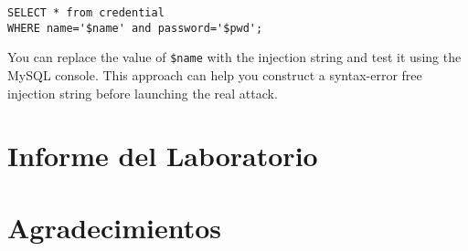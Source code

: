 \begin{lstlisting}
SELECT * from credential 
WHERE name='$name' and password='$pwd';
\end{lstlisting}

You can replace the value of {\tt \$name} with the
injection string and test it using the MySQL console. 
This approach can help you construct a syntax-error 
free injection string before launching the real attack. 



\section{Informe del Laboratorio}





\section*{Agradecimientos}












